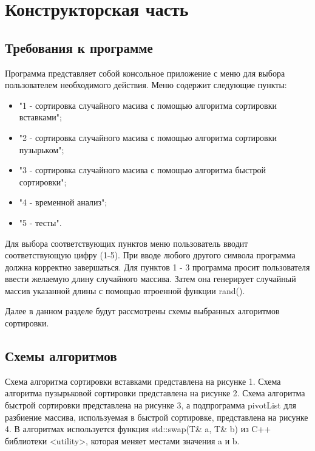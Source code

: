 \documentclass[a4paper,14pt]{report}
\begin{document}
\chapter*{Конструкторская часть}

\section*{Требования к программе}

Программа представляет собой консольное приложение с меню для выбора пользователем необходимого действия.
Меню содержит следующие пункты:
\begin{itemize}
	\item "1 - сортировка случайного масива с помощью алгоритма сортировки вставками";
	\item "2 - сортировка случайного масива с помощью алгоритма сортировки пузырьком";
	\item "3 - сортировка случайного масива с помощью алгоритма быстрой сортировки";
	\item "4 - временной анализ";
	\item "5 - тесты".
\end{itemize}

Для выбора соответствующих пунктов меню пользователь вводит соответствующую цифру (1-5). При вводе любого другого символа программа должна корректно завершаться. Для пунктов 1 - 3 программа просит пользователя ввести желаемую длину случайного массива. Затем она генерирует случайный массив указанной длины с помощью втроенной функции rand().

Далее в данном разделе будут рассмотрены схемы выбранных алгоритмов сортировки.

\section*{Схемы алгоритмов}

Схема алгоритма сортировки вставками представлена на рисунке 1. Схема алгоритма пузырьковой сортировки представлена на рисунке 2. Схема алгоритма быстрой сортировки представлена на рисунке 3, а подпрограмма pivotList для разбиение массива, используемая в быстрой сортировке, представлена на рисунке 4.
В алгоритмах используется функция std::swap(T\& a, T\& b) из C++ библиотеки <utility>, которая меняет местами значения a и b.
\end{document}
